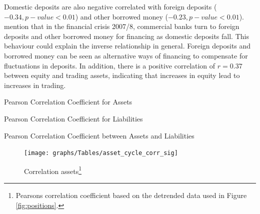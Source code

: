 \documentclass[12pt, a4paper]{article} %
\begin{document}
Domestic deposits are also negative correlated with foreign deposits ($-0.34, p-value<0.01$) and other borrowed money ($-0.23, p-value<0.01$). \cite{bassett2008profits} mention that in the financial crisis 2007/8, commercial banks turn to foreign deposits and other borrowed money for financing as domestic deposits fall. This behaviour could explain the inverse relationship in general. Foreign deposits and borrowed money can be seen as alternative ways of financing to compensate for fluctuations in deposits.
In addition, there is a positive correlation of $r=0.37$ between equity and trading assets, indicating that increases in equity lead to increases in trading.\\



\begin{table}[H]
\begin{minipage}{\textwidth}
\scriptsize

\caption[1]{Pearson Correlation Coefficient for Assets}
\label{tab:corr_assets}
\end{minipage}
\end{table}

\begin{table}[H]
\begin{minipage}{\textwidth}
\scriptsize
\hskip-2.0cm

\caption[1]{Pearson Correlation Coefficient for Liabilities}
\label{tab:corr_liab}
\end{minipage}
\end{table}


\begin{table}[H]
\begin{minipage}{\textwidth}
\scriptsize
\hskip-2.0cm

\caption[1]{Pearson Correlation Coefficient between Assets and Liabilities}
\label{tab:corr_comb}
\end{minipage}
\end{table}

\iffalse
\begin{figure}[H]
\begin{minipage}{\textwidth}
\centering
\caption[1]{Correlation assets\footnote{Pearsons correlation coefficient based on the detrended data used in Figure \ref{fig:positions}.} }
\texttt{[image: graphs/Tables/asset\_cycle\_corr\_sig]}
\label{fig:corr_assets}
\end{minipage}
\end{figure}
\hskip-2.0cm
\end{document}
